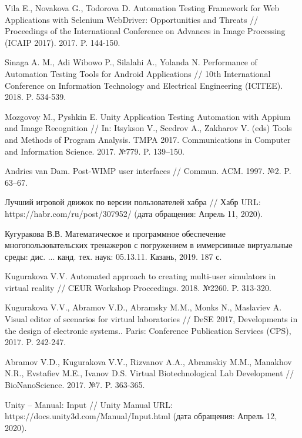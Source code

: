 \nocite{*}
%
%
\begin{thebibliography}{9} 
	
	 Vila E., Novakova G., Todorova D. Automation Testing Framework for Web Applications with Selenium WebDriver: Opportunities and Threats // Proceedings of the International Conference on Advances in Image Processing (ICAIP 2017). 2017. P. 144-150.
	
	 Sinaga A. M., Adi Wibowo P., Silalahi A., Yolanda N. Performance of Automation Testing Tools for Android Applications // 10th International Conference on Information Technology and Electrical Engineering (ICITEE). 2018. P. 534-539.
	
	 Mozgovoy M., Pyshkin E. Unity Application Testing Automation with Appium and Image Recognition // In: Itsykson V., Scedrov A., Zakharov V. (eds) Tools and Methods of Program Analysis. TMPA 2017. Communications in Computer and Information Science. 2017. №779. P. 139--150.
	
	 Andries van Dam. Post-WIMP user interfaces // Commun. ACM. 1997. №2. P. 63–67.
	
	 Лучший игровой движок по версии пользователей хабра // Хабр URL: https://habr.com/ru/post/307952/ (дата обращения: Апрель 11, 2020).
	
	 Кугуракова В.В. Математическое и программное обеспечение многопользовательских тренажеров с погружением в иммерсивные виртуальные среды: дис. ... канд. тех. наук: 05.13.11. Казань, 2019. 187 с.
	
	 Kugurakova V.V. Automated approach to creating multi-user simulators in virtual reality // CEUR Workshop Proceedings. 2018. №2260. P. 313-320.  
	
	 Kugurakova V.V., Abramov V.D., Abramsky M.M., Monks N., Maslaviev A. Visual editor of scenarios for virtual laboratories // DeSE 2017, Developments in the design of electronic systems.. Paris: Conference Publication Services (CPS), 2017. P. 242-247.
	
	 Abramov V.D., Kugurakova V.V., Rizvanov A.A., Abramskiy M.M., Manakhov N.R., Evstafiev M.E., Ivanov D.S. Virtual Biotechnological Lab Development // BioNanoScience. 2017. №7. P. 363-365.
	
	
	 Unity -- Manual: Input // Unity Manual URL: https://docs.unity3d.com/Manual/Input.html (дата обращения: Апрель 12, 2020).
	

\end{thebibliography}
